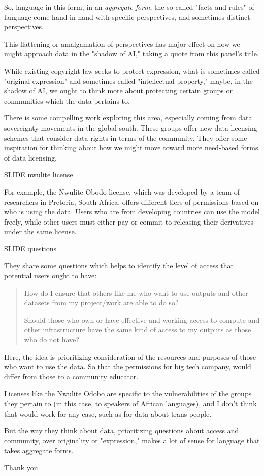 \documentclass[11pt]{article}
\begin{document}
So, language in this form, in an \emph{aggregate form}, the so called
"facts and rules" of language come hand in hand with specific
perspectives, and sometimes distinct perspectives.

This flattening or amalgamation of perspectives has major effect on
how we might approach data in the "shadow of AI," taking a quote from
this panel's title.

While existing copyright law seeks to protect expression, what is
sometimes called "original expression" and sometimes called
"intellectual property," maybe, in the shadow of AI, we ought to think
more about protecting certain groups or communities which the data
pertains to.

There is some compelling work exploring this area, especially coming
from data sovereignty movements in the global south. These groups
offer new data licensing schemes that consider data rights in terms of
the community. They offer some inspiration for thinking about how we
might move toward more need-based forms of data licensing.

SLIDE nwulite license

For example, the Nwulite Obodo license, which was developed by a team
of researchers in Pretoria, South Africa, offers different tiers of
permissions based on who is using the data. Users who are from
developing countries can use the model freely, while other users must
either pay or commit to releasing their derivatives under the same
license.

SLIDE questions

They share some questions which helps to identify the level of access
that potential users ought to have:

\begin{quote}
How do I ensure that others like me who want to use outputs and other
datasets from my project/work are able to do so?

Should those who own or have effective and working access to compute
and other infrastructure have the same kind of access to my outputs as
those who do not have? 
\end{quote}

Here, the idea is prioritizing consideration of the resources and
purposes of those who want to use the data. So that the permissions
for big tech company, would differ from those to a community educator.

Licenses like the Nwulite Odobo are specific to the vulnerabilities of
the groups they pertain to (in this case, to speakers of African
languages), and I don't think that would work for any case, such as
for data about trans people.

But the way they think about data, prioritizing questions about access
and community, over originality or "expression," makes a lot of sense
for language that takes aggregate forms.

Thank you.
\end{document}

